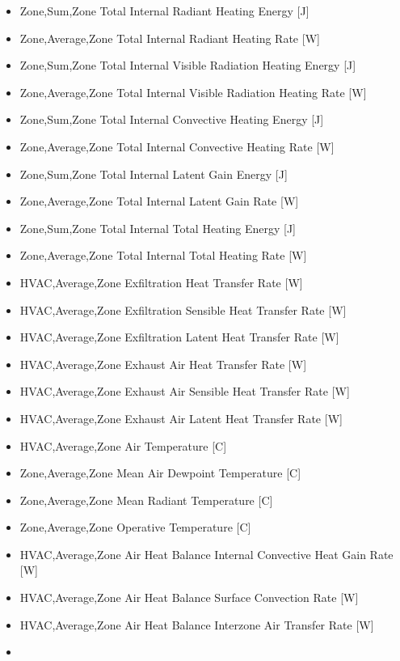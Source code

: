 \begin{itemize}
\item
  Zone,Sum,Zone Total Internal Radiant Heating Energy {[}J{]}
\item
  Zone,Average,Zone Total Internal Radiant Heating Rate {[}W{]}
\item
  Zone,Sum,Zone Total Internal Visible Radiation Heating Energy {[}J{]}
\item
  Zone,Average,Zone Total Internal Visible Radiation Heating Rate {[}W{]}
\item
  Zone,Sum,Zone Total Internal Convective Heating Energy {[}J{]}
\item
  Zone,Average,Zone Total Internal Convective Heating Rate {[}W{]}
\item
  Zone,Sum,Zone Total Internal Latent Gain Energy {[}J{]}
\item
  Zone,Average,Zone Total Internal Latent Gain Rate {[}W{]}
\item
  Zone,Sum,Zone Total Internal Total Heating Energy {[}J{]}
\item
  Zone,Average,Zone Total Internal Total Heating Rate {[}W{]}
\item
  HVAC,Average,Zone Exfiltration Heat Transfer Rate {[}W{]}
\item
  HVAC,Average,Zone Exfiltration Sensible Heat Transfer Rate {[}W{]}
\item
  HVAC,Average,Zone Exfiltration Latent Heat Transfer Rate {[}W{]}
\item
  HVAC,Average,Zone Exhaust Air Heat Transfer Rate {[}W{]}
\item
  HVAC,Average,Zone Exhaust Air Sensible Heat Transfer Rate {[}W{]}
\item
  HVAC,Average,Zone Exhaust Air Latent Heat Transfer Rate {[}W{]}
\item
  HVAC,Average,Zone Air Temperature {[}C{]}
\item
  Zone,Average,Zone Mean Air Dewpoint Temperature {[}C{]}
\item
  Zone,Average,Zone Mean Radiant Temperature {[}C{]}
\item
  Zone,Average,Zone Operative Temperature {[}C{]}
\item
  HVAC,Average,Zone Air Heat Balance Internal Convective Heat Gain Rate {[}W{]}
\item
  HVAC,Average,Zone Air Heat Balance Surface Convection Rate {[}W{]}
\item
  HVAC,Average,Zone Air Heat Balance Interzone Air Transfer Rate {[}W{]}
\item

\end{itemize}
